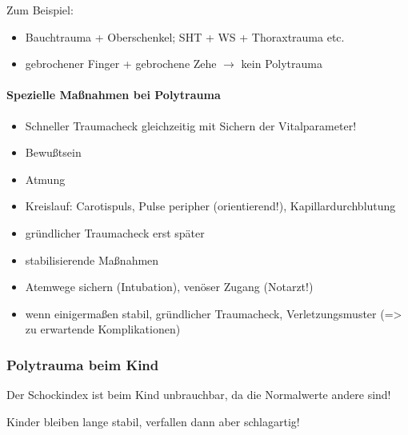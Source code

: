 

Zum Beispiel:
\begin{itemize}
    \item Bauchtrauma + Oberschenkel; SHT + WS + Thoraxtrauma etc.
    \item gebrochener Finger + gebrochene Zehe ${\rightarrow}$ kein
    Polytrauma
\end{itemize}


\begin{gMassnahmenEnv}
    \paragraph{Spezielle Maßnahmen bei Polytrauma}
    \begin{itemize}
        \item Schneller Traumacheck gleichzeitig  mit  Sichern der
        Vitalparameter!
        \item Bewu{\ss}tsein
        \item Atmung
        \item Kreislauf: Carotispuls, Pulse peripher  (orientierend!),
        Kapillardurchblutung
        \item gr\"undlicher Traumacheck erst sp\"ater
        \item stabilisierende Ma{\ss}nahmen
        \item Atemwege sichern (Intubation),  ven\"oser  Zugang (Notarzt!)
        \item wenn einigerma{\ss}en stabil, gr\"undlicher  Traumacheck,
        Verletzungsmuster (={\textgreater} zu  erwartende Komplikationen)
    \end{itemize}
\end{gMassnahmenEnv}


\subsubsection{Polytrauma beim Kind}

Der Schockindex ist beim Kind unbrauchbar, da die
Normalwerte andere sind!

Kinder bleiben lange stabil, verfallen dann aber schlagartig!

